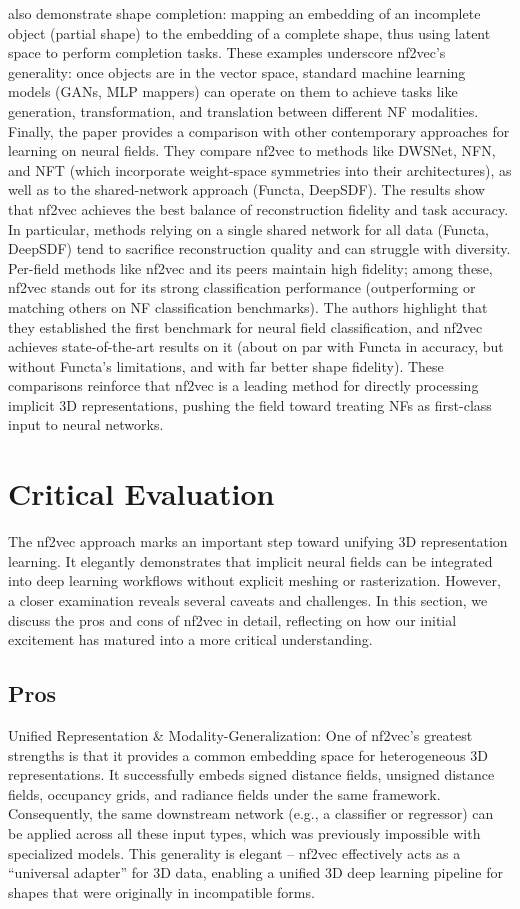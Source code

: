 \documentclass[11pt]{article}
\begin{document}
also demonstrate shape completion: mapping an embedding of an incomplete object (partial shape) to the embedding of a complete shape, thus using latent space to perform completion tasks. These examples underscore nf2vec’s generality: once objects are in the vector space, standard machine learning models (GANs, MLP mappers) can operate on them to achieve tasks like generation, transformation, and translation between different NF modalities. Finally, the paper provides a comparison with other contemporary approaches for learning on neural fields. They compare nf2vec to methods like DWSNet, NFN, and NFT (which incorporate weight-space symmetries into their architectures), as well as to the shared-network approach (Functa, DeepSDF). The results show that nf2vec achieves the best balance of reconstruction fidelity and task accuracy. In particular, methods relying on a single shared network for all data (Functa, DeepSDF) tend to sacrifice reconstruction quality and can struggle with diversity. Per-field methods like nf2vec and its peers maintain high fidelity; among these, nf2vec stands out for its strong classification performance (outperforming or matching others on NF classification benchmarks). The authors highlight that they established the first benchmark for neural field classification, and nf2vec achieves state-of-the-art results on it (about on par with Functa in accuracy, but without Functa’s limitations, and with far better shape fidelity). These comparisons reinforce that nf2vec is a leading method for directly processing implicit 3D representations, pushing the field toward treating NFs as first-class input to neural networks. \section{Critical Evaluation}
The nf2vec approach marks an important step toward unifying 3D representation learning. It elegantly demonstrates that implicit neural fields can be integrated into deep learning workflows without explicit meshing or rasterization. However, a closer examination reveals several caveats and challenges. In this section, we discuss the pros and cons of nf2vec in detail, reflecting on how our initial excitement has matured into a more critical understanding. \subsection*{Pros}
Unified Representation & Modality-Generalization: One of nf2vec’s greatest strengths is that it provides a common embedding space for heterogeneous 3D representations. It successfully embeds signed distance fields, unsigned distance fields, occupancy grids, and radiance fields under the same framework. Consequently, the same downstream network (e.g., a classifier or regressor) can be applied across all these input types, which was previously impossible with specialized models. This generality is elegant – nf2vec effectively acts as a “universal adapter” for 3D data, enabling a unified 3D deep learning pipeline for shapes that were originally in incompatible forms.
\end{document}
